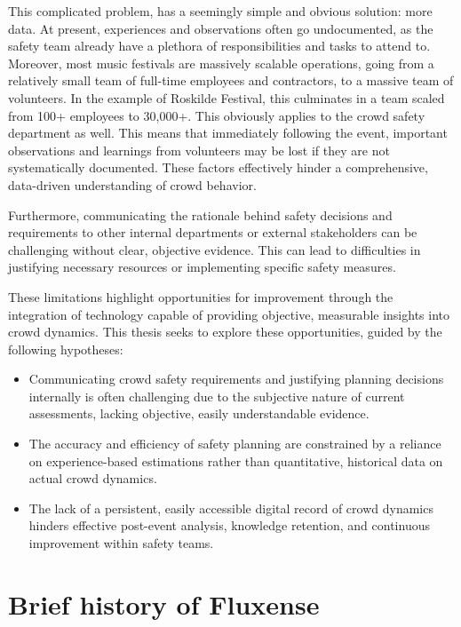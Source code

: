 This complicated problem, has a seemingly simple and obvious solution: more data. At present, experiences and observations often go undocumented, as the safety team already have a plethora of responsibilities and tasks to attend to. Moreover, most music festivals are massively scalable operations, going from a relatively small team of full-time employees and contractors, to a massive team of volunteers. In the example of Roskilde Festival, this culminates in a team scaled from 100+ employees to 30,000+. This obviously applies to the crowd safety department as well. This means that immediately following the event, important observations and learnings from volunteers may be lost if they are not systematically documented. These factors effectively hinder a comprehensive, data-driven understanding of crowd behavior.

Furthermore, communicating the rationale behind safety decisions and requirements to other internal departments or external stakeholders can be challenging without clear, objective evidence. This can lead to difficulties in justifying necessary resources or implementing specific safety measures.

These limitations highlight opportunities for improvement through the integration of technology capable of providing objective, measurable insights into crowd dynamics. This thesis seeks to explore these opportunities, guided by the following hypotheses:

\begin{itemize}
  \item Communicating crowd safety requirements and justifying planning decisions internally is often challenging due to the subjective nature of current assessments, lacking objective, easily understandable evidence.

  \item The accuracy and efficiency of safety planning are constrained by a reliance on experience-based estimations rather than quantitative, historical data on actual crowd dynamics.

  \item The lack of a persistent, easily accessible digital record of crowd dynamics hinders effective post-event analysis, knowledge retention, and continuous improvement within safety teams.
\end{itemize}






\section{Brief history of Fluxense}

